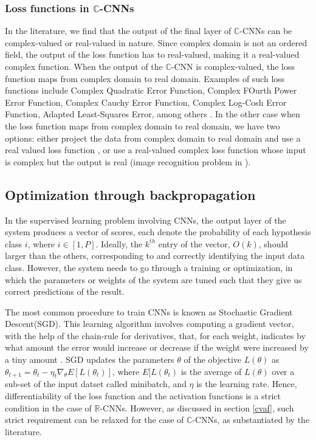  \subsubsection{Loss functions in $\mathbb{C}$-CNNs}
 In the literature, we find that the output of the final layer of $\mathbb{C}$-CNNs can be complex-valued or real-valued in nature. Since complex domain is not an ordered field, the output of the loss function has to real-valued, making it a real-valued complex function. When the output of the $\mathbb{C}$-CNN is complex-valued, the loss function maps from complex domain to real domain. Examples of such loss functions include Complex Quadratic Error Function, Complex FOurth Power Error Function, Complex Cauchy Error Function, Complex Log-Cosh Error Function, Adapted Least-Squares Error, among others \cite{hansch2009classification}\cite{polsarzhang2017complex}\cite{hansch2010complex}. 
 In the other case when the loss function maps from complex domain to real domain, we have two options: either project the data from complex domain to real domain and use a real valued loss function \cite{Guberman}, or use a real-valued complex loss function whose input is complex but the output is real (image recognition problem in \cite{trabelsi2018deep}).    
 
 \subsection{Optimization through backpropagation}\label{optbp}
 In the supervised learning problem involving CNNs, the output layer of the system produces a vector of scores, each denote the probability of each hypothesis class $i$, where $i \in [1,P]$. Ideally, the $k^{th}$ entry of the vector, $O(k)$, should larger than the others, corresponding to and correctly identifying the input data class. However, the system needs to go through a training or optimization, in which the parameters or weights of the system are tuned such that they give us correct predictions of the result.
 
 The most common procedure to train CNNs is known as Stochastic Gradient Descent(SGD). This learning algorithm involves computing a gradient vector,  with the help of the chain-rule for derivatives, that, for each weight, indicates by what amount the error would increase or decrease if the weight were increased by a tiny amount \cite{nature}. SGD updates the parameters $\theta$ of the objective $L(\theta)$ as $\theta_{t+1} = \theta_{t} - \eta_{t}\nabla_{\theta}E[L(\theta_{t})]$,
 where $E[L(\theta_{t})$ is the average of $L(\theta)$ over a sub-set of the input datset called minibatch, and $\eta$ is the learning rate. Hence, differentiability of the loss function and the activation functions is a strict condition in the case of $\mathbb{R}$-CNNs. However, as discussed in section \ref{cvaf}, such strict requirement can be relaxed for the case of $\mathbb{C}$-CNNs, as substantiated by the literature. 
    
 





